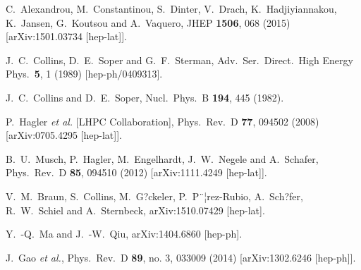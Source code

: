 \documentclass[english,preprint,aps,prd,showpacs,superscriptaddress,nofootinbib,tightenlines]{revtex4}
\begin{document}
\begin{thebibliography}{99}


  C.~Alexandrou, M.~Constantinou, S.~Dinter, V.~Drach, K.~Hadjiyiannakou, K.~Jansen, G.~Koutsou and A.~Vaquero,
  JHEP {\bf 1506}, 068 (2015)
  [arXiv:1501.03734 [hep-lat]].


  J.~C.~Collins, D.~E.~Soper and G.~F.~Sterman,
  Adv.\ Ser.\ Direct.\ High Energy Phys.\  {\bf 5}, 1 (1989)  [hep-ph/0409313].  %

  J.~C.~Collins and D.~E.~Soper,
  Nucl.\ Phys.\ B {\bf 194}, 445 (1982).

  P.~Hagler {\it et al.} [LHPC Collaboration],
  Phys.\ Rev.\ D {\bf 77}, 094502 (2008)
  [arXiv:0705.4295 [hep-lat]].

  B.~U.~Musch, P.~Hagler, M.~Engelhardt, J.~W.~Negele and A.~Schafer,
  Phys.\ Rev.\ D {\bf 85}, 094510 (2012)
  [arXiv:1111.4249 [hep-lat]].

  V.~M.~Braun, S.~Collins, M.~G?ckeler, P.~P¨¦rez-Rubio, A.~Sch?fer, R.~W.~Schiel and A.~Sternbeck,
  arXiv:1510.07429 [hep-lat].

Y.~-Q.~Ma and J.~-W.~Qiu,
arXiv:1404.6860 [hep-ph].

  J.~Gao {\it et al.},
  Phys.\ Rev.\ D {\bf 89}, no. 3, 033009 (2014)
  [arXiv:1302.6246 [hep-ph]].



\end{thebibliography}
\end{document}
